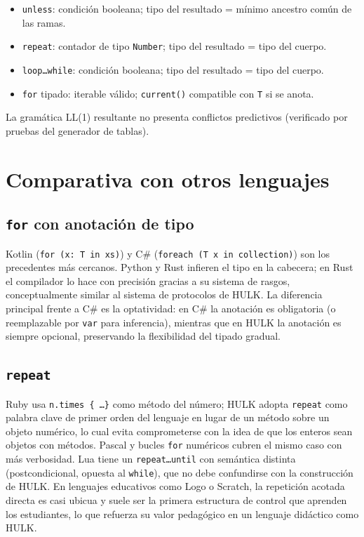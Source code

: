 \documentclass[11pt,a4paper]{article}
\begin{document}
\begin{itemize}
  \item \texttt{unless}: condición booleana; tipo del resultado = mínimo ancestro común de las ramas.
  \item \texttt{repeat}: contador de tipo \texttt{Number}; tipo del resultado = tipo del cuerpo.
  \item \texttt{loop\ldots while}: condición booleana; tipo del resultado = tipo del cuerpo.
  \item \texttt{for} tipado: iterable válido; \texttt{current()} compatible con \texttt{T} si se anota.
\end{itemize}

La gramática LL(1) resultante no presenta conflictos predictivos (verificado por pruebas del generador de tablas).

\section{Comparativa con otros lenguajes}

\subsection{\texttt{for} con anotación de tipo}

Kotlin (\texttt{for (x: T in xs)}) y C\# (\texttt{foreach (T x in collection)}) son los precedentes más cercanos. Python y Rust infieren el tipo en la cabecera; en Rust el compilador lo hace con precisión gracias a su sistema de rasgos, conceptualmente similar al sistema de protocolos de HULK. La diferencia principal frente a C\# es la optatividad: en C\# la anotación es obligatoria (o reemplazable por \texttt{var} para inferencia), mientras que en HULK la anotación es siempre opcional, preservando la flexibilidad del tipado gradual.

\subsection{\texttt{repeat}}

Ruby usa \texttt{n.times \{ \ldots \}} como método del número; HULK adopta \texttt{repeat} como palabra clave de primer orden del lenguaje en lugar de un método sobre un objeto numérico, lo cual evita comprometerse con la idea de que los enteros sean objetos con métodos. Pascal y bucles \texttt{for} numéricos cubren el mismo caso con más verbosidad. Lua tiene un \texttt{repeat\ldots until} con semántica distinta (postcondicional, opuesta al \texttt{while}), que no debe confundirse con la construcción de HULK. En lenguajes educativos como Logo o Scratch, la repetición acotada directa es casi ubicua y suele ser la primera estructura de control que aprenden los estudiantes, lo que refuerza su valor pedagógico en un lenguaje didáctico como HULK.
\end{document}

